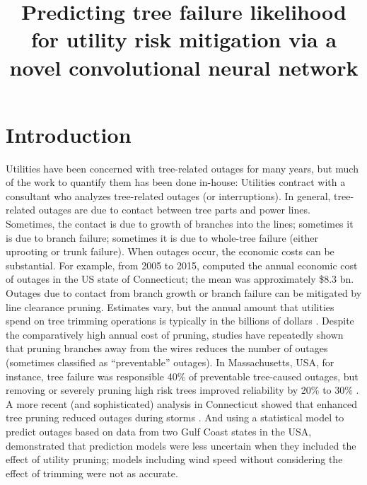 \documentclass[11pt,twoside]{article}
\numberwithin{equation}{section}
\newcommand{\?}{\stackrel{?}{=}}
\begin{document}
\title{Predicting tree failure likelihood for utility risk mitigation via a novel convolutional neural network}
\date{}
\maketitle


\section{Introduction}
Utilities have been concerned with tree-related outages for many years, but much of the work to quantify them has been
done in-house: Utilities contract with a consultant who analyzes tree-related outages (or interruptions). In general,
tree-related outages are due to contact between tree parts and power lines. Sometimes, the contact is due to growth of
branches into the lines; sometimes it is due to branch failure; sometimes it is due to whole-tree failure (either uprooting or
trunk failure). When outages occur, the economic costs can be substantial. For example, from 2005 to 2015,
\cite{graziano2020wider} computed the annual economic cost of outages in the US state of Connecticut; the mean was
approximately \$8.3 bn.  Outages due to contact from branch growth or branch failure can be mitigated by line clearance
pruning. Estimates vary, but the annual amount that utilities spend on tree trimming operations is typically in
the billions of dollars \cite{guggenmoos2003effects}. Despite the comparatively high annual cost of pruning,
studies have repeatedly shown that pruning branches away from the wires reduces the number of outages (sometimes
classified as “preventable” outages). In Massachusetts, USA, for instance, tree failure was responsible 40\% of preventable
tree-caused outages, but removing or severely pruning high risk trees improved reliability by 20\% to 30\%
\cite{simpson1996treecaused}. A more recent (and sophisticated) analysis in Connecticut showed that enhanced tree
pruning reduced outages during storms \cite{parent2019analysis}. And using a statistical model to predict outages based
on data from two Gulf Coast states in the USA, \citet{nateghi2014power} demonstrated that prediction models were less
uncertain when they included the effect of utility pruning; models including wind speed without considering the effect of
trimming were not as accurate.
\end{document}
